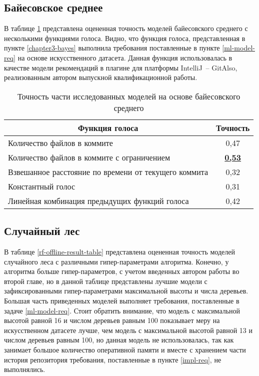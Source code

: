     \subsection{Байесовское среднее}\label{bayes-quality-offline}
В таблице \ref{bayes-offline-result-table} представлена оцененная точность моделей байесовского среднего с несколькими функциями голоса. Видно, что функция голоса, представленная в пункте \ref{chapter3-bayes} выполнила требования поставленные в пункте \ref{ml-model-req} на основе искусственного датасета. Данная функция использовалась в качестве модели рекомендаций в плагине для платформы IntelliJ~-- GitAlso, реализованным автором выпускной квалификационной работы.
        \begin{table}[!h]   
        \caption{Точность части исследованных моделей на основе байесовского среднего}\label{bayes-offline-result-table}
        \centering
        \begin{tabular}{|l|c|}\hline
        \multicolumn{1}{|c|}{\textbf{Функция голоса}} & \textbf{Точность}\\\hline
        Количество файлов в коммите & 0,47\\\hline
        Количество файлов в коммите с ограничением  & \textbf{\uline{0,53}} \\\hline
        Взвешанное расстояние по времени от текущего коммита  & 0,32\\\hline
        Константный голос  & 0,31\\\hline
        Линейная комбинация предыдущих функций голоса  & 0,42\\\hline
        \end{tabular}
        \end{table}
    \subsection{Случайный лес}\label{forest-quality-offline}
В таблице \ref{rf-offline-result-table} представлена оцененная точность моделей случайного леса с различными гипер-параметрами алгоритма. Конечно, у алгоритма больше гипер-параметров, с учетом введенных автором работы во второй главе, но в данной таблице представлены лучшие модели с зафиксированными гипер-параметрами максимальной высоты и числа деревьев. Большая часть приведенных моделей выполняет требования, поставленные в задаче \ref{ml-model-req}. Стоит обратить внимание, что модель с максимальной высотой равной 16 и числом деревьев равным 100 показывает меру на искусственном датасете лучше, чем модель с максимальной высотой равной 13 и числом деревьев равным 100, но данная модель не использовалась, так как занимает большое количество оперативной памяти и вместе с хранением части история репозитория требования, поставленные в пункте \ref{impl-req}, не выполнялись. 

